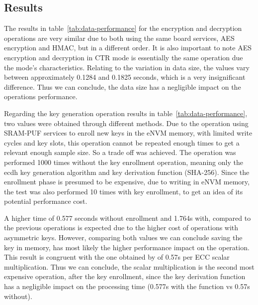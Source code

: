 \subsection{Results}\label{chap:evaluation:services:results}



The results in table~\ref{tab:data-performance} for the encryption and decryption operations are very similar due to both using the same board services, AES encryption and HMAC, but in a different order. It is also important to note AES encryption and decryption in CTR mode is essentially the same operation due the mode's characteristics.
Relating to the variation in data size, the values vary between approximately 0.1284 and 0.1825 seconds, which is a very insignificant difference. Thus we can conclude, the data size has a negligible impact on the operations performance.



Regarding the key generation operation results in table~\ref{tab:data-performance}, two values were obtained through different methods. Due to the operation using SRAM-PUF services to enroll new keys in the eNVM memory, with limited write cycles and key slots, this operation cannot be repeated enough times to get a relevant enough sample size.
So a trade off was achieved. The operation was performed 1000 times without the key enrollment operation, meaning only the ecdh key generation algorithm and key derivation function (SHA-256).
Since the enrollment phase is presumed to be expensive, due to writing in eNVM memory, the test was also performed 10 times with key enrollment, to get an idea of its potential performance cost.

A higher time of 0.577 seconds without enrollment and 1.764s with, compared to the previous operations is expected due to the higher cost of operations with asymmetric keys.
However, comparing both values we can conclude saving the key in memory, has most likely the higher performance impact on the operation.
This result is congruent with the one obtained by \cite{parrinha2017flexible} of 0.57s per ECC scalar multiplication.
Thus we can conclude, the scalar multiplication is the second most expensive operation, after the key enrollment, since the key derivation function has a negligible impact on the processing time (0.577s with the function vs 0.57s without).

